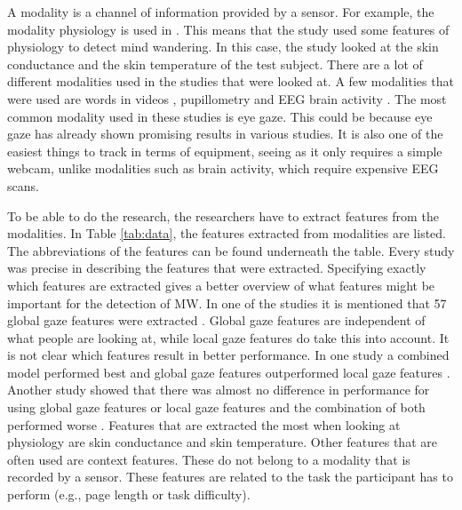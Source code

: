 A modality is a channel of information provided by a sensor. For example, the modality physiology is used in \cite{Blanchard2014AutomatedLearning}. This means that the study used some features of physiology to detect mind wandering. In this case, the study looked at the skin conductance and the skin temperature of the test subject. There are a lot of different modalities used in the studies that were looked at. A few modalities that were used are words in videos \cite{Jo2017AMind}, pupillometry \cite{ISI:000443429900018} and EEG brain activity \cite{Mishchenko2015DetectingTespiti}\cite{Russell2016MonitoringEnvironments}. The most common modality used in these studies is eye gaze. This could be because eye gaze has already shown promising results in various studies. It is also one of the easiest things to track in terms of equipment, seeing as it only requires a simple webcam, unlike modalities such as brain activity, which require expensive EEG scans.

To be able to do the research, the researchers have to extract features from the modalities. In Table \ref{tab:data}, the features extracted from modalities are listed. The abbreviations of the features can be found underneath the table. Every study was precise in describing the features that were extracted. Specifying exactly which features are extracted gives a better overview of what features might be important for the detection of MW. In one of the studies it is mentioned that 57 global gaze features were extracted \cite{Hutt2017OutClassroom}. Global gaze features are independent of what people are looking at, while local gaze features do take this into account. It is not clear which features result in better performance. In one study a combined model performed best and global gaze features outperformed local gaze features \cite{Bixler2014TowardWanderingd}. Another study showed that there was almost no difference in performance for using global gaze features or local gaze features and the combination of both performed worse \cite{Hutt2017OutClassroom}. Features that are extracted the most when looking at physiology are skin conductance and skin temperature. Other features that are often used are context features. These do not belong to a modality that is recorded by a sensor. These features are related to the task the participant has to perform (e.g., page length or task difficulty).

